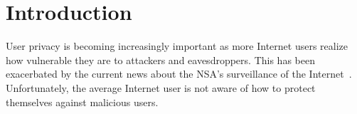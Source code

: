 \documentclass[conference]{IEEEtran}
\begin{document}


%
%


%


\section{Introduction}
User privacy is becoming increasingly important as more Internet users realize how vulnerable they are to attackers and eavesdroppers.  This has been exacerbated by the current news about the NSA's surveillance of the Internet~\cite{nsa}.  Unfortunately, the average Internet user is not aware of how to protect themselves against malicious users.   
\end{document}
